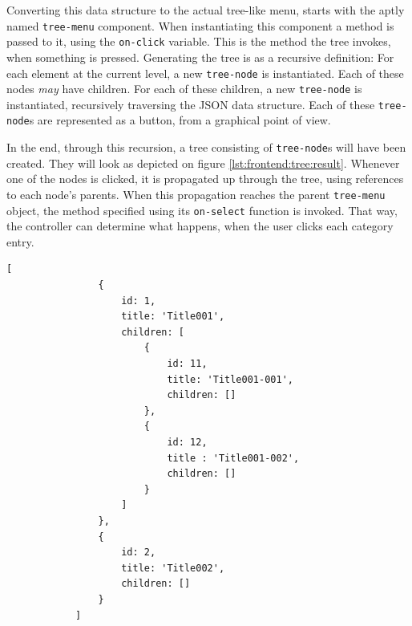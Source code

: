 		Converting this data structure to the actual tree-like menu, starts with the aptly named \verb=tree-menu= component. When instantiating this component a method is passed to it, using the \verb=on-click= variable. This is the method the tree invokes, when something is pressed. Generating the tree is as a recursive definition: For each element at the current level, a new \verb=tree-node= is instantiated. Each of these nodes \emph{may} have children. For each of these children, a new \verb=tree-node= is instantiated, recursively traversing the JSON data structure.	Each of these \verb=tree-node=s are represented as a button, from a graphical point of view.

		In the end, through this recursion, a tree consisting of \verb=tree-node=s will have been created. They will look as depicted on figure \ref{lst:frontend:tree:result}. Whenever one of the nodes is clicked, it is propagated up through the tree, using references to each node's parents. When this propagation reaches the parent \verb=tree-menu= object, the method specified using its \verb=on-select= function is invoked. That way, the controller can determine what happens, when the user clicks each category entry.

		\pagebreak

		\begin{lstlisting}[style=json2,gobble=12, caption={The front-end's category tree data structure},label={lst:frontend:tree:data}]
            [
                {
                    id: 1,
                    title: 'Title001',
                    children: [
                        {
                            id: 11,
                            title: 'Title001-001',
                            children: []
                        },
                        {
                            id: 12,
                            title : 'Title001-002',
                            children: []
                        }
                    ]
                },
                {
                    id: 2,
                    title: 'Title002',
                    children: []
                }
            ]
		\end{lstlisting}
	
